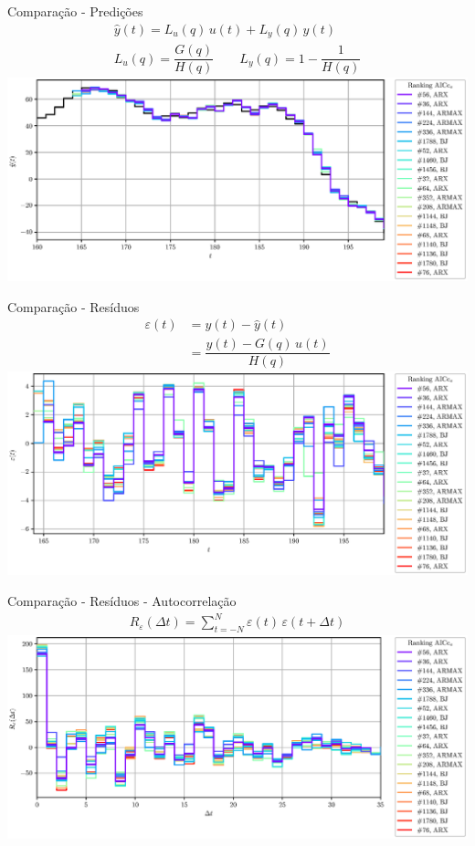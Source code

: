 \documentclass{beamer}
\newcommand{\Prod}{\,}
\renewcommand{\Prod}{\,}
\begin{document}
\begin{frame}{Comparação - Predições}
  \begin{gather}
    \hat{y}(t) = L_u(q) \, u(t) + L_y(q) \, y(t)
    \\
    L_u(q) = \dfrac{G(q)}{H(q)}
    \qquad
    L_y(q) = 1 - \dfrac{1}{H(q)}
    \end{gather}
  \centering
  \includegraphics[width=.9\linewidth]{prediction_AICCv}
\end{frame}

\begin{frame}{Comparação - Resíduos}
  \begin{align}
    \varepsilon(t)
    &= y(t) - \hat{y}(t)
    \\
    &= \dfrac{y(t) - G(q) \Prod u(t)}{H(q)}
  \end{align}
  \centering
  \includegraphics[width=.9\linewidth]{residue_AICCv}
\end{frame}

\begin{frame}{Comparação - Resíduos - Autocorrelação}
  \begin{gather}
    R_{\varepsilon}(\Delta t) = \sum_{t=-N}^{N} \varepsilon(t) \Prod \varepsilon(t + \Delta t)
  \end{gather}
  \centering
  \includegraphics[width=.9\linewidth]{residue_autocorrelation_AICCv}
\end{frame}
\end{document}
